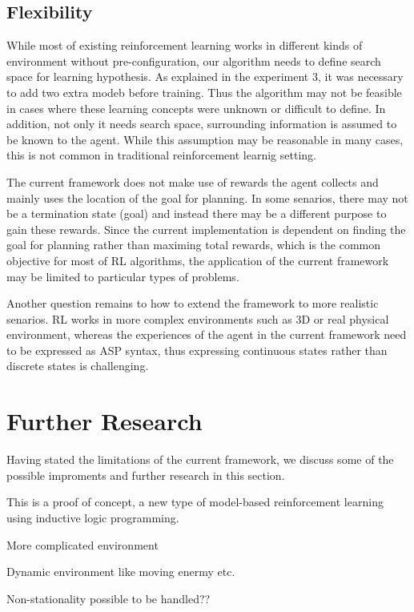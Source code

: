 \subsection{Flexibility}
While most of existing reinforcement learning works in different kinds of environment without pre-configuration, our algorithm
needs to define search space for learning hypothesis. As explained in the experiment 3, it was necessary to add two extra modeb before training.
Thus the algorithm may not be feasible in cases where these learning concepts were unknown or difficult to define. 
In addition, not only it needs search space, surrounding information is assumed to be known to the agent. 
While this assumption may be reasonable in many cases, this is not common in traditional reinforcement learnig setting.

The current framework does not make use of rewards the agent collects and mainly uses the location of the goal for planning.
In some senarios, there may not be a termination state (goal) and instead there may be a different purpose to gain these rewards. 
Since the current implementation is dependent on finding the goal for planning rather than maximing total rewards, which is the common objective for most of RL algorithms,
the application of the current framework may be limited to particular types of problems.

Another question remains to how to extend the framework to more realistic senarios. RL works in more complex environments such as 3D or real physical environment, 
whereas the experiences of the agent in the current framework need to be expressed as ASP syntax, thus expressing continuous states rather than discrete states is challenging.

\section{Further Research}
\label{further_research}

Having stated the limitations of the current framework, we discuss some of the possible improments and further research in this section.

This is a proof of concept, a new type of model-based reinforcement learning using inductive logic programming. 

More complicated environment

Dynamic environment like moving enermy etc.

Non-stationality possible to be handled??

